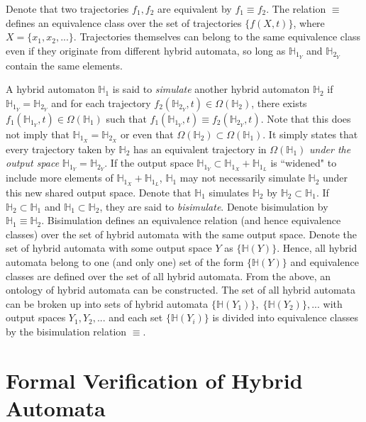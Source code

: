 Denote that two trajectories $f_1, f_2$ are equivalent by $f_1 \equiv f_2$. The relation $\equiv$ defines an equivalence class over the set of trajectories $\{ f(X,t) \}$, where $X = \{x_1, x_2, ...\}$. Trajectories themselves can belong to the same equivalence class even if they originate from different hybrid automata, so long as $\mathbb{H}_{1_Y}$ and $\mathbb{H}_{2_Y}$ contain the same elements.

A hybrid automaton $\mathbb{H}_1$ is said to \textit{simulate} another hybrid automaton $\mathbb{H}_2$ if $\mathbb{H}_{1_Y} = \mathbb{H}_{2_Y}$ and for each trajectory $f_2(\mathbb{H}_{2_Y}, t) \in \Omega(\mathbb{H}_2)$, there exists $f_1(\mathbb{H}_{1_Y}, t) \in \Omega(\mathbb{H}_1)$ such that $f_1(\mathbb{H}_{1_Y}, t) \equiv f_2(\mathbb{H}_{2_Y}, t)$. Note that this does not imply that $\mathbb{H}_{1_X} = \mathbb{H}_{2_X}$ or even that $\Omega(\mathbb{H}_2) \subset \Omega(\mathbb{H}_1)$. It simply states that every trajectory taken by $\mathbb{H}_2$ has an equivalent trajectory in $\Omega(\mathbb{H}_1)$ \textit{under the output space} $\mathbb{H}_{1_Y} = \mathbb{H}_{2_Y}$. If the output space $\mathbb{H}_{1_Y} \subset \mathbb{H}_{1_X} + \mathbb{H}_{1_L}$ is ``widened" to include more elements of $\mathbb{H}_{1_X} + \mathbb{H}_{1_L}$, $\mathbb{H}_1$ may not necessarily simulate $\mathbb{H}_2$ under this new shared output space. Denote that $\mathbb{H}_1$ simulates $\mathbb{H}_2$ by $\mathbb{H}_2 \subset \mathbb{H}_1$. If $\mathbb{H}_2 \subset \mathbb{H}_1$ and $\mathbb{H}_1 \subset \mathbb{H}_2$, they are said to \textit{bisimulate}. Denote bisimulation by $\mathbb{H}_1 \equiv \mathbb{H}_2$. Bisimulation defines an equivalence relation (and hence equivalence classes) over the set of hybrid automata with the same output space. Denote the set of hybrid automata with some output space $Y$ as $\{ \mathbb{H}(Y) \}$. Hence, all hybrid automata belong to one (and only one) set of the form $\{ \mathbb{H}(Y) \}$ and equivalence classes are defined over the set of all hybrid automata. From the above, an ontology of hybrid automata can be constructed. The set of all hybrid automata can be broken up into sets of hybrid automata $\{ \mathbb{H}(Y_1) \}, \; \{ \mathbb{H}(Y_2) \}, ...$ with output spaces $Y_1, Y_2, ...$ and each set $\{ \mathbb{H}(Y_i) \}$ is divided into equivalence classes by the bisimulation relation $\equiv$.

\section{Formal Verification of Hybrid Automata}

